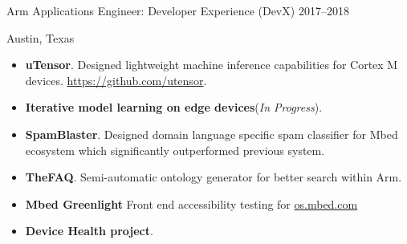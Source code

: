 \documentclass[]{friggeri-cv} %
\begin{document}
\begin{entrylist}

\entry
{Arm}
{Applications Engineer: Developer Experience (DevX)}
{2017--2018}
{Austin, Texas \\
\begin{itemize}
\item \textbf{uTensor}. Designed lightweight machine inference capabilities for Cortex M devices. \url{https://github.com/utensor}.
\item \textbf{Iterative model learning on edge devices}(\textit{In Progress}). 
\item \textbf{SpamBlaster}. Designed domain language specific spam classifier for Mbed ecosystem which significantly outperformed previous system. 
\item \textbf{TheFAQ}. Semi-automatic ontology generator for better search within Arm.
\item \textbf{Mbed Greenlight} Front end accessibility testing for \url{os.mbed.com}
\item \textbf{Device Health project}. 
\end{itemize} }


\end{entrylist}
\end{document}
